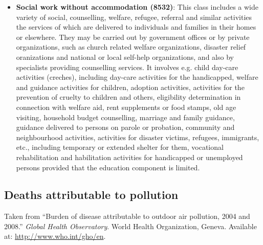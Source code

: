 \documentclass[a4paper,12pt]{article}
\begin{document}
\begin{itemize}
\begin{itemize}
\item \textbf{Social work without accommodation (8532)}: This class includes a wide variety of social, counselling, welfare, refugee, referral and similar activities the services of which are delivered to individuals and families in their homes or elsewhere. They may be carried out by government offices or by private organizations, such as church related welfare organizations, disaster relief oranizations and national or local self-help organizations, and also by specialists providing counselling services. It involves e.g. child day-care activities (creches), including day-care activities for the handicapped, welfare and guidance activities for children, adoption activities, activities for the prevention of cruelty to children and others, eligibility determination in connection with welfare aid, rent supplements or food stamps, old age visiting, household budget counselling, marriage and family guidance, guidance delivered to persons on parole or probation, community and neighbourhood activities, activities for disaster victims, refugees, immigrants, etc., including temporary or extended shelter for them, vocational rehabilitation and habilitation activities for handicapped or unemployed persons provided that the education component is limited.
\end{itemize}
\end{itemize}

\subsection{Deaths attributable to pollution}

Taken from ``Burden of disease attributable to outdoor air pollution, 2004 and 2008.'' \textit{Global Health Observatory}. World Health Organization, Geneva. Available at: \url{http://www.who.int/gho/en}.
\end{document}
